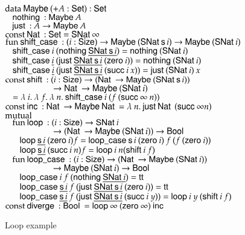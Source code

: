 \begin{figure}[p]
$\data \Maybe ( + A : \Set ) : \Set$\\
$\spc  \nothing : \Maybe A$\\
$\spc  \just : A \ra\Maybe A$\\

$\const \Nat : \Set = \SNat \infty$\\

$\fun \shiftcase : (i : \Size) \ra\Maybe (\SNat \s i) \ra\Maybe (\SNat i)$\\
$\spc \shiftcase i \: (\nothing \inacc{\SNat \s i}) = \nothing (\SNat i)$\\
$\spc \shiftcase \inacc{i} \: (\just \inacc{\SNat \s i} \: (\zero i)) = \nothing (\SNat i)$\\
$\spc \shiftcase \inacc{i} \: (\just \inacc{\SNat \s i} \: (\suc i \: x)) = \just (\SNat i) \: x$\\

$\const \shift : (i : \Size) \ra(\Nat \ra \Maybe (\SNat \s i)) $\\
$\spcx \spcx \ra\Nat \ra \Maybe (\SNat i) $\\ 
$\spc = \lam{i}{\lam{f}{\lam{n}{\shiftcase i \: (f \: (\suc \infty \: n))}}}$\\

$\const \inc : \Nat \ra \Maybe \Nat = \lam{n}{\just \Nat \: (\suc \infty n)}$\\

$\mutual$\\
$\spc \fun \lop : (i : \Size ) \ra \SNat i $\\
$\spcx \spcx \ra (\Nat \ra\Maybe (\SNat i)) \ra\Bool$\\
$\spc \spc \lop \inacc{\s i} \: (\zero i) f = \lopcase \s i \: (\zero i) \: f \: (f \: (\zero i))$\\
$\spc \spc \lop \inacc{\s i} \: (\suc i \: n) f = \lop i \: n (\shift i \: f)$\\

$\spc \fun \lopcase : (i : \Size ) \ra (\Nat \ra \Maybe (\SNat i)) $\\
$\spcx \spcx \ra \Maybe (\SNat i) \ra\Bool$\\
$\spc \spc \lopcase i \: f \: (\nothing \inacc{\SNat i}) = \ttt $\\
$\spc \spc \lopcase \inacc{\s i} \: f \: (\just \inacc{\SNat \s i} \: (\zero i)) = \ttt $\\
$\spc \spc \lopcase \inacc{\s i} \: f \: (\just \inacc{\SNat \s i} \: (\suc i \: y)) = \lop i \: y \: (\shift i \:f) $\\

$\const \diverge : \Bool = \lop \infty\: (\zero \infty) \: \inc$\\
\caption{Loop example}
\label{loop}
\end{figure}

